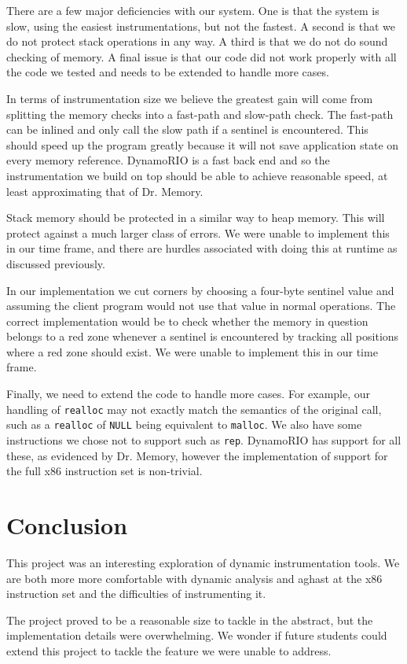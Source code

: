 \documentclass{article}
\newcommand{\code}[1]{\texttt{#1}}
\begin{document}
There are a few major deficiencies with our system.  One is that the system is slow, using the easiest instrumentations, but not the fastest.  A second is that we do not protect stack operations in any way.  A third is that we do not do sound checking of memory.  A final issue is that our code did not work properly with all the code we tested and needs to be extended to handle more cases.

In terms of instrumentation size we believe the greatest gain will come from splitting the memory checks into a fast-path and slow-path check.  The fast-path can be inlined and only call the slow path if a sentinel is encountered.  This should speed up the program greatly because it will not save application state on every memory reference.  DynamoRIO is a fast back end and so the instrumentation we build on top should be able to achieve reasonable speed, at least approximating that of Dr. Memory.

Stack memory should be protected in a similar way to heap memory.  This will protect against a much larger class of errors.  We were unable to implement this in our time frame, and there are hurdles associated with doing this at runtime as discussed previously.

In our implementation we cut corners by choosing a four-byte sentinel value and assuming the client program would not use that value in normal operations.  The correct implementation would be to check whether the memory in question belongs to a red zone whenever a sentinel is encountered by tracking all positions where a red zone should exist.  We were unable to implement this in our time frame.

Finally, we need to extend the code to handle more cases.  For example, our handling of \code{realloc} may not exactly match the semantics of the original call, such as a \code{realloc} of \code{NULL} being equivalent to \code{malloc}.  We also have some instructions we chose not to support such as \code{rep}.  DynamoRIO has support for all these, as evidenced by Dr. Memory, however the implementation of support for the full x86 instruction set is non-trivial.


\section{Conclusion} %
\label{sec:Conclusion}

This project was an interesting exploration of dynamic instrumentation tools.  We are both more more comfortable with dynamic analysis and aghast at the x86 instruction set and the difficulties of instrumenting it.

The project proved to be a reasonable size to tackle in the abstract, but the implementation details were overwhelming.  We wonder if future students could extend this project to tackle the feature we were unable to address.




\end{document}

